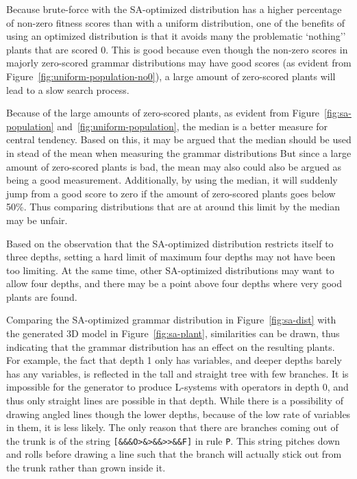 Because brute-force with the \gls{SA}-optimized distribution has a higher percentage of non-zero fitness scores than with a uniform distribution, one of the benefits of using an optimized distribution is that it avoids many the problematic `nothing'' plants that are scored 0.
This is good because even though the non-zero scores in majorly zero-scored grammar distributions may have good scores (as evident from Figure~\ref{fig:uniform-population-no0}), a large amount of zero-scored plants will lead to a slow search process.

Because of the large amounts of zero-scored plants, as evident from Figure~\ref{fig:sa-population} and~\ref{fig:uniform-population}, the median is a better measure for central tendency.
Based on this, it may be argued that the median should be used in stead of the mean when measuring the grammar distributions
But since a large amount of zero-scored plants is bad, the mean may also could also be argued as being a good measurement.
Additionally, by using the median, it will suddenly jump from a good score to zero if the amount of zero-scored plants goes below 50\%.
Thus comparing distributions that are at around this limit by the median may be unfair.

Based on the observation that the \gls{SA}-optimized distribution restricts itself to three depths, setting a hard limit of maximum four depths may not have been too limiting.
At the same time, other \gls{SA}-optimized distributions may want to allow four depths, and there may be a point above four depths where very good plants are found.

Comparing the \gls{SA}-optimized grammar distribution in Figure~\ref{fig:sa-dist} with the generated 3D model in Figure~\ref{fig:sa-plant}, similarities can be drawn, thus indicating that the grammar distribution has an effect on the resulting plants.
For example, the fact that depth 1 only has variables, and deeper depths barely has any variables, is reflected in the tall and straight tree with few branches.
It is impossible for the generator to produce \glspl{L-system} with operators in depth 0, and thus only straight lines are possible in that depth.
While there is a possibility of drawing angled lines though the lower depths, because of the low rate of variables in them, it is less likely.
The only reason that there are branches coming out of the trunk is of the string \texttt{[\&\&\&O>\&>\&\&>{}>\&\&F]} in rule \texttt{P}.
This string pitches down and rolls before drawing a line such that the branch will actually stick out from the trunk rather than grown inside it.

